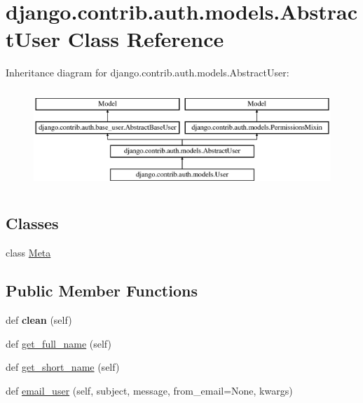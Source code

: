 \hypertarget{classdjango_1_1contrib_1_1auth_1_1models_1_1_abstract_user}{}\section{django.\+contrib.\+auth.\+models.\+Abstract\+User Class Reference}
\label{classdjango_1_1contrib_1_1auth_1_1models_1_1_abstract_user}
Inheritance diagram for django.\+contrib.\+auth.\+models.\+Abstract\+User\+:\begin{figure}[H]
\begin{center}
\leavevmode
\includegraphics[height=3.771044cm]{classdjango_1_1contrib_1_1auth_1_1models_1_1_abstract_user}
\end{center}
\end{figure}
\subsection*{Classes}
\begin{DoxyCompactItemize}
\item 
class \mbox{\hyperlink{classdjango_1_1contrib_1_1auth_1_1models_1_1_abstract_user_1_1_meta}{Meta}}
\end{DoxyCompactItemize}
\subsection*{Public Member Functions}
\begin{DoxyCompactItemize}
\item 
\mbox{\label{classdjango_1_1contrib_1_1auth_1_1models_1_1_abstract_user_a16177ac80d9628a91b04baa79efb6fd9}} 
def {\bfseries clean} (self)
\item 
def \mbox{\hyperlink{classdjango_1_1contrib_1_1auth_1_1models_1_1_abstract_user_a9ab7c75ada347dfacc37866fbce799f5}{get\+\_\+full\+\_\+name}} (self)
\item 
def \mbox{\hyperlink{classdjango_1_1contrib_1_1auth_1_1models_1_1_abstract_user_af5d2ec4c4064827789b473ce93647d56}{get\+\_\+short\+\_\+name}} (self)
\item 
def \mbox{\hyperlink{classdjango_1_1contrib_1_1auth_1_1models_1_1_abstract_user_ae08682055407fa8fc7de3cdc734097cd}{email\+\_\+user}} (self, subject, message, from\+\_\+email=None, kwargs)
\end{DoxyCompactItemize}
